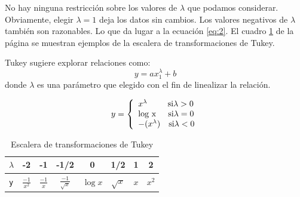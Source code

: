 \documentclass{article}
\begin{document}
No hay ninguna restricción sobre los valores de $\lambda$ que podamos considerar. Obviamente, elegir $\lambda = 1$ deja los datos sin cambios. Los valores negativos de $\lambda$ también son razonables. Lo que da lugar a la ecuación \ref{eq:2}. El cuadro \ref{tab:2} de la página \pageref{tab:2} se muestran ejemplos de la escalera de transformaciones de Tukey.

Tukey sugiere explorar relaciones como:
\begin{equation}\label{eq:1}
y=ax_{1}^{\lambda}+ b    
\end{equation}
donde $\lambda$ es una parámetro que elegido con el fin de linealizar la relación. 

\begin{equation}\label{eq:2}
y= \left\lbrace 
\begin{array}{lr}
\textup{$x^{\lambda}$}\quad \quad\:\: \text{si} \lambda >0 \\
\textup{log x} \quad \:\: \text{si} \lambda = 0 \\
\textup{$-(x^{\lambda})$}\quad \text{si} \lambda <0 \\
\end{array}
\right.
\end{equation}

\begin{table}[]\caption{Escalera de transformaciones de Tukey}
\centering
\begin{tabular}{| l | c | c | c | c | c | c | c |}
\hline
$\lambda$ & -2&  -1& -1/2 & 0  &1/2 & 1 & 2\\
\hline 
\texttt{y} & $\frac{-1}{x^2}$ & $\frac{-1}{x}$ &  $\frac{-1}{\sqrt{x}}$ & $\log x$ & $\sqrt{x}$ & $x$ & $x^2$\\
\hline 
\end{tabular}
\label{tab:2}
\end{table}
\end{document}
